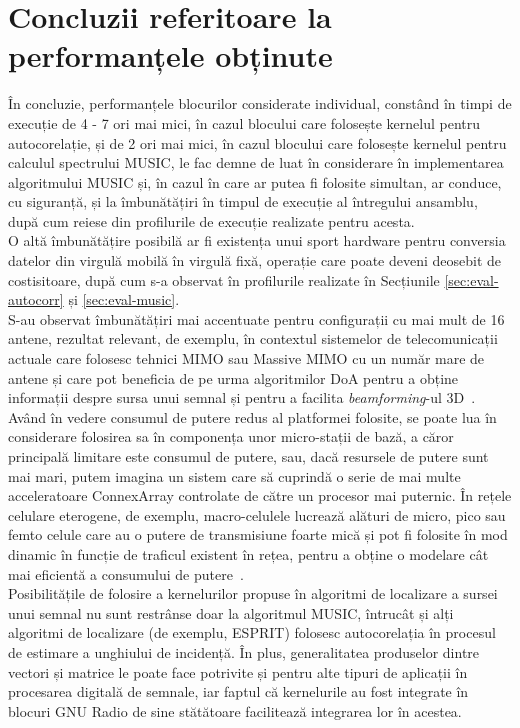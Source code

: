\section{Concluzii referitoare la performanțele obținute}
\label{sec:eval-concl}

În concluzie, performanțele blocurilor considerate individual, constând în timpi de
execuție de 4 - 7 ori mai mici, în cazul blocului care folosește kernelul
pentru autocorelație, și de 2 ori mai mici, în cazul blocului care folosește
kernelul pentru calculul spectrului MUSIC, le fac demne de luat în considerare
în implementarea algoritmului MUSIC și, în cazul în care ar putea fi folosite
simultan, ar conduce, cu siguranță, și la îmbunătățiri în timpul de execuție al
întregului ansamblu, după cum reiese din profilurile de execuție realizate
pentru acesta. \\

O altă îmbunătățire posibilă ar fi existența unui sport hardware pentru
conversia datelor din virgulă mobilă în virgulă fixă, operație care poate deveni
deosebit de costisitoare, după cum s-a observat în profilurile realizate în
Secțiunile \ref{sec:eval-autocorr} și \ref{sec:eval-music}. \\

S-au observat îmbunătățiri mai accentuate pentru configurații cu mai mult de 16
antene, rezultat relevant, de exemplu, în contextul sistemelor de
telecomunicații actuale care folosesc tehnici MIMO sau Massive MIMO cu un număr
mare de antene și care pot beneficia de pe urma algoritmilor DoA pentru a obține
informații despre sursa unui semnal și pentru a facilita \textit{beamforming}-ul
3D~\cite{wang2015two}. \\

Având în vedere consumul de putere redus al platformei folosite, se poate lua în
considerare folosirea sa în componența unor micro-stații de bază, a căror
principală limitare este consumul de putere, sau, dacă resursele de putere sunt
mai mari, putem imagina un sistem care să cuprindă o serie de mai multe
acceleratoare ConnexArray controlate de către un procesor mai puternic. În
rețele celulare eterogene, de exemplu, macro-celulele lucrează alături de micro,
pico sau femto celule care au o putere de transmisiune foarte mică și pot fi
folosite în mod dinamic în funcție de traficul existent în rețea, pentru a
obține o modelare cât mai eficientă a consumului de
putere~\cite{lorincz2012measurements}. \\

Posibilitățile de folosire a kernelurilor propuse în algoritmi de localizare a
sursei unui semnal nu sunt restrânse doar la algoritmul MUSIC, întrucât și alți
algoritmi de localizare (de exemplu, ESPRIT) folosesc autocorelația în procesul
de estimare a unghiului de incidență. În plus, generalitatea produselor dintre
vectori și matrice le poate face potrivite și pentru alte tipuri de aplicații în
procesarea digitală de semnale, iar faptul că kernelurile au fost integrate în
blocuri GNU Radio de sine stătătoare facilitează integrarea lor în acestea.

